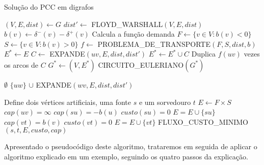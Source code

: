     \begin{algorithm}
        \caption{Solução do PCC em digrafos}
        \label{di-pcc-pseudocode}
        \begin{algorithmic}[1]
        \State $(V, E, dist) \gets G$
        \State $dist' \gets $ FLOYD\_WARSHALL$(V, E, dist)$
            \State $b(v) \gets \delta^-(v) - \delta^+(v)$ \Comment Calcula a função demanda
        \EndFor
        \State $F \gets \{v \in V : b(v) < 0\}$
        \State $S \gets \{v \in V : b(v) > 0\}$
        \State $f \gets $ PROBLEMA\_DE\_TRANSPORTE$(F, S, dist, b)$
        \State $E^* \gets E$ 
            \State $C \gets$ EXPANDE$(uv, E, dist, dist')$
                \State $E^* \gets E^* \cup C$ \Comment Duplica $f(uv)$ vezes os arcos de $C$ 
            \EndFor
        \EndFor
        \State $G^* \gets (V, E^*)$
        \State \Return CIRCUITO\_EULERIANO$(G^*)$
        \EndFunction 

        \Return $\emptyset$
        \EndIf
            \State \Return $\{uw\}$  $\cup$ EXPANDE$(wv, E, dist, dist')$
            \EndIf
        \EndFor
        \EndFunction

            \State Define dois vértices artificiais, uma fonte $s$ e um sorvedouro $t$
            \State $E \gets F\times S$
                \State $cap(uv) = \infty$
            \EndFor
                \State $cap(su) = -b(u)$
                \State $custo(su) = 0$
                \State $E = E \cup \{su\}$
            \EndFor
                \State $cap(vt) = b(v)$
                \State $custo(vt) = 0$
                \State $E = E \cup \{vt\}$
            \EndFor
            \State \Return FLUXO\_CUSTO\_MINIMO$(s, t, E, custo, cap)$
        \EndFunction
        \end{algorithmic}
    \end{algorithm}

    Apresentado o pseudocódigo deste algoritmo, trataremos em seguida de aplicar o algoritmo explicado em um exemplo, seguindo os quatro passos da explicação.

